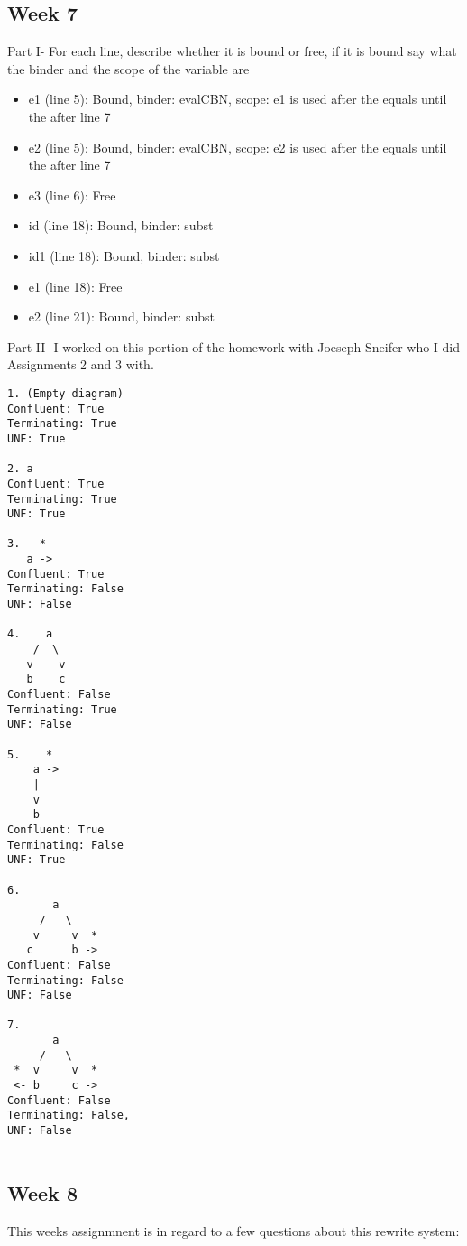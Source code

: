 \documentclass{article}
\theoremstyle{theorem}
\theoremstyle{definition}
\theoremstyle{remark}
\begin{document}
\subsection{Week 7}

Part I-
For each line, describe whether it is bound or free, if it is bound say what the binder and the scope of the variable are

\begin{itemize}
    \item e1 (line 5): Bound, binder: evalCBN, scope: e1 is used after the equals until the after line 7
    \item e2 (line 5): Bound, binder: evalCBN, scope: e2 is used after the equals until the after line 7
    \item e3 (line 6): Free
    \item id (line 18): Bound, binder: subst
    \item id1 (line 18): Bound, binder: subst
    \item e1 (line 18): Free
    \item e2 (line 21): Bound, binder: subst
\end{itemize}

Part II- I worked on this portion of the homework with Joeseph Sneifer who I did Assignments 2 and 3 with.

\begin{lstlisting}
1. (Empty diagram)
Confluent: True
Terminating: True
UNF: True

2. a
Confluent: True
Terminating: True
UNF: True

3.   *
   a ->
Confluent: True
Terminating: False
UNF: False

4.    a
    /  \
   v    v
   b    c
Confluent: False
Terminating: True
UNF: False

5.    *
    a ->
    |
    v
    b
Confluent: True
Terminating: False
UNF: True

6.
       a
     /   \
    v     v  *
   c      b ->
Confluent: False
Terminating: False
UNF: False

7.
       a
     /   \
 *  v     v  *
 <- b     c ->
Confluent: False
Terminating: False,
UNF: False


\end{lstlisting}





\subsection{Week 8}
This weeks assignmnent is in regard to a few questions about this rewrite system:
\end{document}
